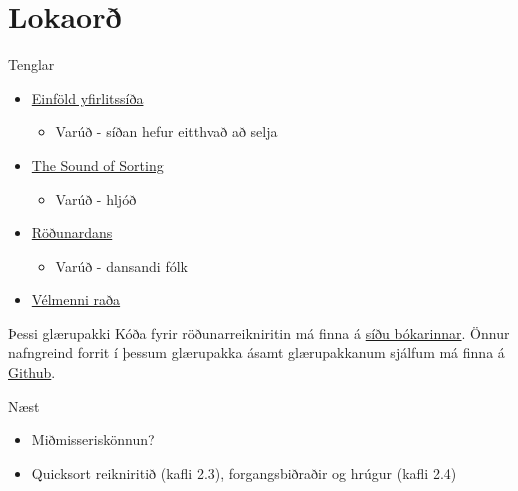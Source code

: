 \documentclass{beamer}
\begin{document}
\section{Lokaorð}

\begin{frame}{Tenglar}
	\begin{itemize}
		\item \href{https://www.toptal.com/developers/sorting-algorithms/}{Einföld yfirlitssíða}
		      \begin{itemize}
			      \item Varúð - síðan hefur eitthvað að selja
		      \end{itemize}
		\item \href{https://www.youtube.com/watch?v=kPRA0W1kECg}{The Sound of Sorting}
		      \begin{itemize}
			      \item Varúð - hljóð
		      \end{itemize}
		\item \href{https://www.youtube.com/watch?v=ROalU379l3U}{Röðunardans}
		      \begin{itemize}
			      \item Varúð - dansandi fólk
		      \end{itemize}
		\item \href{https://www.youtube.com/watch?v=es2T6KY45cA}{Vélmenni raða}
	\end{itemize}
\end{frame}

\begin{frame}{Þessi glærupakki}
	Kóða fyrir röðunarreikniritin má finna á \href{http://algs4.cs.princeton.edu/code/}{síðu bókarinnar}. Önnur nafngreind forrit í þessum glærupakka ásamt glærupakkanum sjálfum má finna á \href{https://github.com/Ernir/kennsluefni/tree/master/T2/Code/w6}{Github}.
\end{frame}

\begin{frame}{Næst}
	\begin{itemize}
		\item Miðmisseriskönnun?
		\item Quicksort reikniritið (kafli 2.3), forgangsbiðraðir og hrúgur (kafli 2.4)
	\end{itemize}
\end{frame}
\end{document}

